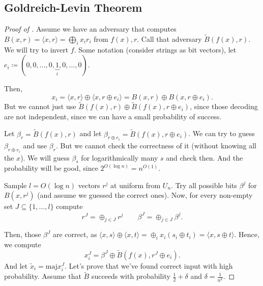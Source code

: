 
\subsection{Goldreich-Levin Theorem}

\begin{proof}[Proof of ]
  Assume we have an adversary that computes $B(x, r) = \langle x, r\rangle = \bigoplus_i x_i r_i$ from  $f(x), r$. 
  Call that adversary $\tilde B(f(x), r)$.
  We will try to invert  $f$.
  Some notation (consider strings as bit vectors), let $e_i \coloneqq (0, 0, \ldots, 0, \underbrace{1}_i, 0, \ldots, 0)$.

  Then, 
  \[
    x_i = \langle x, r\rangle \oplus \langle x, r \oplus e_i \rangle = B(x, r) \oplus B(x, r \oplus e_i).
  \] 
  But we cannot just use $\tilde B(f(x), r) \oplus \tilde B(f(x), r \oplus e_i)$, since those decoding are not independent, since we can have a small probability of success.

  Let $\beta_r = \tilde B(f(x), r)$ and let  $\beta_{r \oplus e_i} = \tilde B(f(x), r \oplus e_i)$.
  We can try to guess $\beta_{r \oplus e_i}$ and use $\beta_r$.
  But we cannot check the correctness of it (without knowing all the $x$).
  We will guess $\beta_s$ for logarithmically many  $s$ and check then. 
  And the probability will be good, since $2^{O(\log n)} = n^{O(1)}$.

  Sample $l = O (\log n)$ vectors  $r^j$ at uniform from  $U_n$.
  Try all possible bits  $\beta^j$ for  $B(x, r^j)$ (and assume we guessed the correct ones).
  Now, for every non-empty set  $J \subseteq \{1, \ldots, l\}$ compute
  \[
    r^J = \oplus_{j \in J} r^j \qquad \beta^J = \oplus_{j \in J} \beta^j.
  \] 

  Then, those $\beta^J$ are correct, as  $\langle x, s \rangle \oplus \langle x, t \rangle = \oplus_i x_i (s_i \oplus t_i) = \langle x, s \oplus t \rangle.$
  Hence, we compute 
   \[
    x_{i}^J = \beta^J \oplus \tilde B(f(x), r^J \oplus e_i).
  \] 
  And let $\tilde x_i = \text{maj} x_i^J$.
  Let's prove that we've found correct input with high probability.
  Assume that $\tilde B$ succeeds with probability  $\frac{1}{2} + \delta$ and $\delta = \frac{1}{n^{k}}$.


\end{proof}
